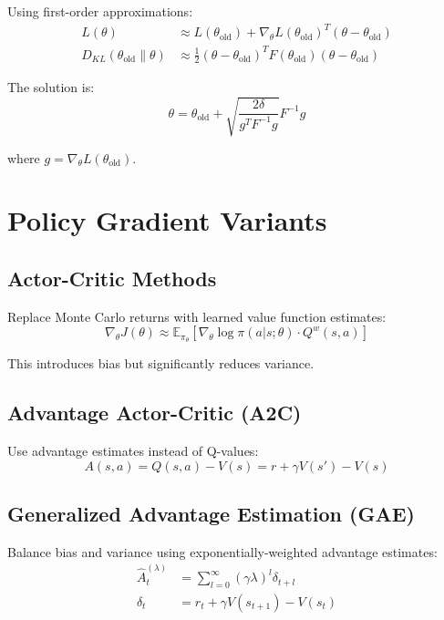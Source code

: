 Using first-order approximations:
\begin{align}
L(\theta) &\approx L(\theta_{\text{old}}) + \nabla_\theta L(\theta_{\text{old}})^T (\theta - \theta_{\text{old}}) \\
D_{KL}(\theta_{\text{old}} \| \theta) &\approx \frac{1}{2} (\theta - \theta_{\text{old}})^T F(\theta_{\text{old}}) (\theta - \theta_{\text{old}})
\end{align}

The solution is:
\begin{equation}
\theta = \theta_{\text{old}} + \sqrt{\frac{2\delta}{g^T F^{-1} g}} F^{-1} g
\end{equation}

where $g = \nabla_\theta L(\theta_{\text{old}})$.

\section{Policy Gradient Variants}

\subsection{Actor-Critic Methods}

Replace Monte Carlo returns with learned value function estimates:
\begin{equation}
\nabla_\theta J(\theta) \approx \mathbb{E}_{\pi_\theta} \left[ \nabla_\theta \log \pi(a|s; \theta) \cdot Q^w(s,a) \right]
\end{equation}

This introduces bias but significantly reduces variance.

\subsection{Advantage Actor-Critic (A2C)}

Use advantage estimates instead of Q-values:
\begin{equation}
A(s,a) = Q(s,a) - V(s) = r + \gamma V(s') - V(s)
\end{equation}

\subsection{Generalized Advantage Estimation (GAE)}

Balance bias and variance using exponentially-weighted advantage estimates:
\begin{align}
\hat{A}_t^{(\lambda)} &= \sum_{l=0}^\infty (\gamma \lambda)^l \delta_{t+l} \\
\delta_t &= r_t + \gamma V(s_{t+1}) - V(s_t)
\end{align}

